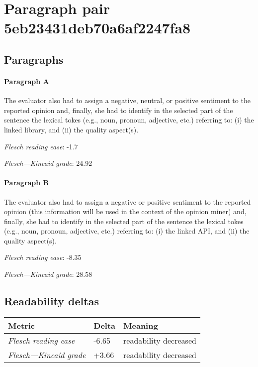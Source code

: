 \section{Paragraph pair 5eb23431deb70a6af2247fa8}
\subsection{Paragraphs}
\paragraph{Paragraph A}
The evaluator also had to assign a negative, neutral, or positive sentiment to the reported opinion and, finally, she had to identify in the selected part of the sentence the lexical tokes (e.g., noun, pronoun, adjective, etc.) referring to: (i) the linked library, and (ii) the quality aspect(s).\par\medskip
\emph{Flesch reading ease}: -1.7\par
\emph{Flesch---Kincaid grade}: 24.92

\paragraph{Paragraph B}
The evaluator also had to assign a negative or positive sentiment to the reported opinion (this information will be used in the context of the opinion miner) and, finally, she had to identify in the selected part of the sentence the lexical tokes (e.g., noun, pronoun, adjective, etc.) referring to: (i) the linked API, and (ii) the quality aspect(s).\par\medskip
\emph{Flesch reading ease}: -8.35\par
\emph{Flesch---Kincaid grade}: 28.58

\subsection{Readability deltas}

\begin{tabular}{lll}
\toprule
               \textbf{Metric} & \textbf{Delta} &       \textbf{Meaning} \\
\midrule
    \emph{Flesch reading ease} &          -6.65 &  readability decreased \\
 \emph{Flesch---Kincaid grade} &          +3.66 &  readability decreased \\
\bottomrule
\end{tabular}

